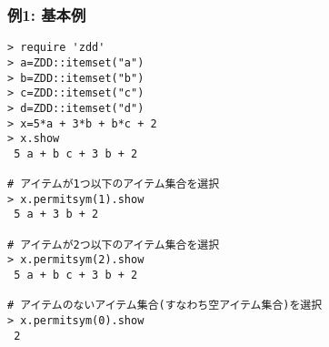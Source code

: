\subsubsection*{例1: 基本例}



\begin{Verbatim}[baselinestretch=0.7,frame=single]
> require 'zdd'
> a=ZDD::itemset("a")
> b=ZDD::itemset("b")
> c=ZDD::itemset("c")
> d=ZDD::itemset("d")
> x=5*a + 3*b + b*c + 2
> x.show
 5 a + b c + 3 b + 2

# アイテムが1つ以下のアイテム集合を選択
> x.permitsym(1).show
 5 a + 3 b + 2

# アイテムが2つ以下のアイテム集合を選択
> x.permitsym(2).show
 5 a + b c + 3 b + 2

# アイテムのないアイテム集合(すなわち空アイテム集合)を選択
> x.permitsym(0).show
 2
\end{Verbatim}
